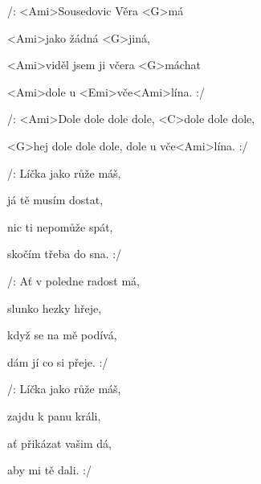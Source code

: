 

\zs
/: <Ami>Sousedovic Věra <G>má

<Ami>jako žádná <G>jiná,

<Ami>viděl jsem ji včera <G>máchat

<Ami>dole u <Emi>vče<Ami>lína. :/
\ks

\zr
/: <Ami>Dole dole dole dole, <C>dole dole dole,

<G>hej dole dole dole, dole u vče<Ami>lína. :/
\kr

\zs
/: Líčka jako růže máš,

já tě musím dostat,

nic ti nepomůže spát,

skočím třeba do sna. :/
\ks

\zr \kr

\zs
/: Ať v poledne radost má,

slunko hezky hřeje,

když se na mě podívá,

dám jí co si přeje. :/
\ks

\zr \kr

\zs
/: Líčka jako růže máš,

zajdu k panu králi,

ať přikázat vašim dá,

aby mi tě dali. :/
\ks

\zr \kr

\kp

